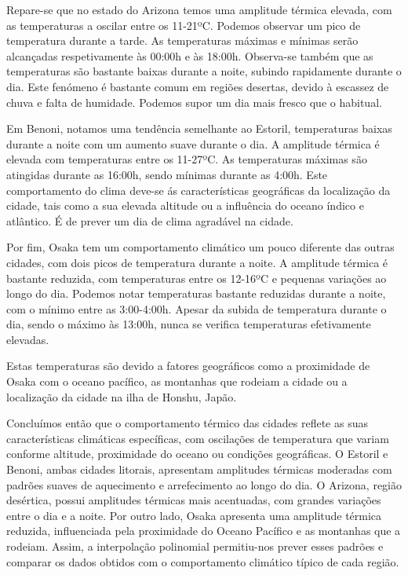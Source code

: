 \documentclass[12pt]{article}
\begin{document}
\hspace{0.5cm}
Repare-se que no estado do Arizona temos uma amplitude térmica elevada, com as temperaturas a oscilar entre os 11-21ºC. Podemos observar um pico de temperatura durante a tarde. As temperaturas máximas e mínimas serão alcançadas respetivamente às 00:00h e às 18:00h. Observa-se também que as temperaturas são bastante baixas durante a noite, subindo rapidamente durante o dia. Este fenómeno é bastante comum em regiões desertas, devido à escassez de chuva e falta de humidade\cite{mundoEducacaoDeserto}. Podemos supor um dia mais fresco que o habitual.

\hspace{0.5cm}
Em Benoni, notamos uma tendência semelhante ao Estoril, temperaturas baixas durante a noite com um aumento suave durante o dia. A amplitude térmica é elevada com temperaturas entre os 11-27ºC. As temperaturas máximas são atingidas durante as 16:00h, sendo mínimas durante as 4:00h. Este comportamento do clima deve-se ás características geográficas da localização da cidade, tais como a sua elevada altitude ou a influência do oceano índico e atlântico\cite{benoniWiki}. É de prever um dia de clima agradável na cidade.

\hspace{0.5cm}
Por fim, Osaka tem um comportamento climático um pouco diferente das outras cidades, com dois picos de temperatura durante a noite. A amplitude térmica é bastante reduzida, com temperaturas entre os 12-16ºC e pequenas variações ao longo do dia. Podemos notar temperaturas bastante reduzidas durante a noite, com o mínimo entre as 3:00-4:00h. Apesar da subida de temperatura durante o dia, sendo o máximo às 13:00h, nunca se verifica temperaturas efetivamente elevadas.

\hspace{0.5cm} Estas temperaturas são devido a fatores geográficos como a proximidade de Osaka com o oceano pacífico, as montanhas que rodeiam a cidade ou a localização da cidade na ilha de Honshu, Japão.

\hspace{0.5cm} Concluímos então que o comportamento térmico das cidades reflete as suas características climáticas específicas, com oscilações de temperatura que variam conforme altitude, proximidade do oceano ou condições geográficas. O Estoril e Benoni, ambas cidades litorais, apresentam amplitudes térmicas moderadas com padrões suaves de aquecimento e arrefecimento ao longo do dia. O Arizona, região desértica, possui amplitudes térmicas mais acentuadas, com grandes variações entre o dia e a noite. Por outro lado, Osaka apresenta uma amplitude térmica reduzida, influenciada pela proximidade do Oceano Pacífico e as montanhas que a rodeiam. Assim, a interpolação polinomial permitiu-nos prever esses padrões e comparar os dados obtidos com o comportamento climático típico de cada região.  
\end{document}

